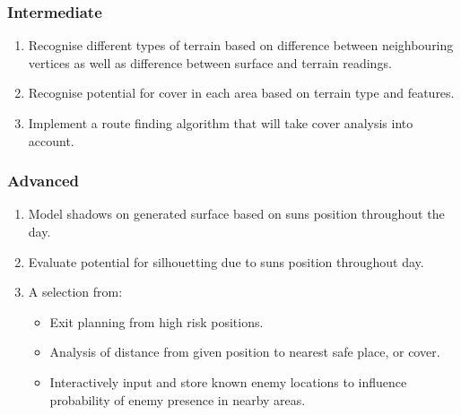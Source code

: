 \documentclass[12pt,a4paper]{article}
\begin{document}
  \subsubsection{Intermediate}
  \begin{enumerate}
    \item Recognise different types of terrain based on difference between neighbouring vertices as well as difference between surface and terrain readings.
    \item Recognise potential for cover in each area based on terrain type and features.
    \item Implement a route finding algorithm that will take cover analysis into account.
  \end{enumerate}

  \subsubsection{Advanced}
  \begin{enumerate}
    \item Model shadows on generated surface based on sun\textquotesingle s position throughout the day.
    \item Evaluate potential for silhouetting due to sun\textquotesingle s position throughout day.
    \item A selection from:
    \begin{itemize}
      \item Exit planning from high risk positions.
      \item Analysis of distance from given position to nearest safe place, or cover.
      \item Interactively input and store known enemy locations to influence probability of enemy presence in nearby areas.
    \end{itemize}
  \end{enumerate}
\end{document}
